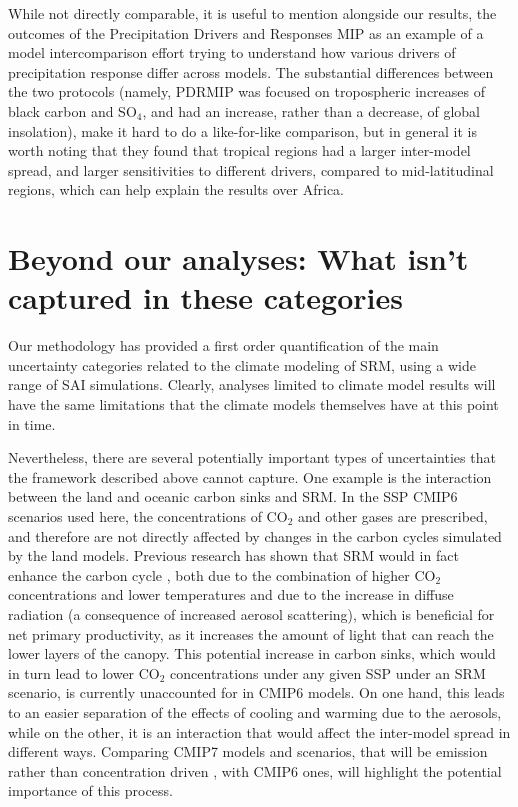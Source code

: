 \documentclass[acp, manuscript]{copernicus}
\begin{document}
While not directly comparable, it is useful to mention alongside our results, the outcomes of the Precipitation Drivers and Responses MIP \citep[PDRMIP][]{PDRMIP2016} as an example of a model intercomparison effort trying to understand how various drivers of precipitation response differ across models. The substantial differences between the two protocols (namely, PDRMIP was focused on tropospheric increases of black carbon and SO$_4$, and had an increase, rather than a decrease, of global insolation), make it hard to do a like-for-like comparison, but in general it is worth noting that they found that tropical regions had a larger inter-model spread, and larger sensitivities to different drivers, compared to mid-latitudinal regions, which can help explain the results over Africa.

\section{Beyond our analyses: What isn't captured in these categories}

Our methodology has provided a first order quantification of the main uncertainty categories related to the climate modeling of SRM, using a wide range of SAI simulations. Clearly, analyses limited to climate model results will have the same limitations that the climate models themselves have at this point in time.

Nevertheless, there are several potentially important types of uncertainties that the framework described above cannot capture.
One example is the interaction between the land and oceanic carbon sinks and SRM. In the SSP CMIP6 scenarios used here, the concentrations of CO$_2$ and other gases are prescribed, and therefore are not directly affected by changes in the carbon cycles simulated by the land models. Previous research has shown that SRM would in fact enhance the carbon cycle \citep{Zhao2024}, both due to the combination of higher CO$_2$ concentrations and lower temperatures and due to the increase in diffuse radiation (a consequence of increased aerosol scattering), which is beneficial for net primary productivity, as it increases the amount of light that can reach the lower layers of the canopy. This potential increase in carbon sinks, which would in turn lead to lower CO$_2$ concentrations under any given SSP under an SRM scenario, is currently unaccounted for in CMIP6 models. On one hand, this leads to an easier separation of the effects of cooling and warming due to the aerosols, while on the other, it is an interaction that would affect the inter-model spread in different ways. Comparing CMIP7 models and scenarios, that will be emission rather than concentration driven \citep{ScenarioMIP}, with CMIP6 ones, will highlight the potential importance of this process.
\end{document}
